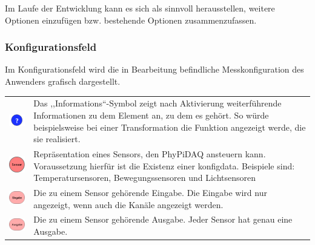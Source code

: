 \documentclass[parskip=full]{scrartcl}
\begin{document}
Im Laufe der Entwicklung kann es sich als sinnvoll herausstellen, weitere Optionen einzufügen bzw. bestehende Optionen zusammenzufassen.

\subsubsection{Konfigurationsfeld}

Im Konfigurationsfeld wird die in Bearbeitung befindliche Messkonfiguration des Anwenders grafisch dargestellt.

\begin{tabular}[t]{p{1cm} p{10cm}}
	\vspace{0cm}\includegraphics[width = 1 cm]{Grafik/Information.png} & Das ,,Informations``-Symbol zeigt nach Aktivierung weiterführende Informationen zu dem Element an, zu dem es gehört. So würde beispielsweise bei einer Transformation die Funktion angezeigt werde, die sie realisiert.\newline\\\cline{1-2}
	\vspace{0cm}\includegraphics[width = 1 cm]{Grafik/Sensorelement.png} & Repräsentation eines Sensors, den PhyPiDAQ ansteuern kann. Voraussetzung hierfür ist die Existenz einer \gls{konfigdata}. Beispiele sind: Temperatursensoren, Bewegungssensoren und Lichtsensoren\newline\\
	\vspace{0cm}\includegraphics[width = 1 cm]{Grafik/Eingabe-Sensor.png} & Die zu einem Sensor gehörende Eingabe. Die Eingabe wird nur angezeigt, wenn auch die Kanäle angezeigt werden.\newline\\
	\vspace{0cm}\includegraphics[width = 1 cm]{Grafik/Ausgabe-Sensor.png} & Die zu einem Sensor gehörende Ausgabe. Jeder Sensor hat genau eine Ausgabe.\newline\\

\end{tabular}
\end{document}
